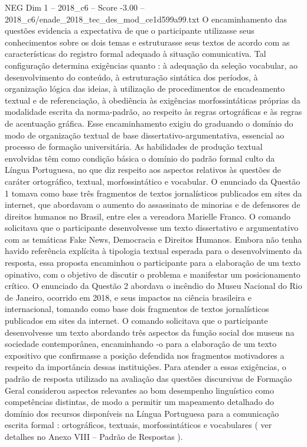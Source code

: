 \begin{textsample}{NEG Dim 1 – 2018\_c6 – Score -3.00 – 2018\_c6/enade\_2018\_tec\_des\_mod\_ce1d599a99.txt}
O encaminhamento das questões evidencia a expectativa de que o participante utilizasse seus conhecimentos sobre os dois temas e estruturasse seus textos de acordo com as características do registro formal adequado à situação comunicativa.
Tal configuração determina exigências quanto : à adequação da seleção vocabular, ao desenvolvimento do conteúdo, à estruturação sintática dos períodos, à organização lógica das ideias, à utilização de procedimentos de encadeamento textual e de referenciação, à obediência às exigências morfossintáticas próprias da modalidade escrita da norma-padrão, ao respeito às regras ortográficas e às regras de acentuação gráfica.
Esse encaminhamento exigiu do graduando o domínio do modo de organização textual de base dissertativo-argumentativa, essencial ao processo de formação universitária.
As habilidades de produção textual envolvidas têm como condição básica o domínio do padrão formal culto da Língua Portuguesa, no que diz respeito aos aspectos relativos às questões de caráter ortográfico, textual, morfossintático e vocabular.
O enunciado da Questão 1 tomava como base três fragmentos de textos jornalísticos publicados em sites da internet, que abordavam o aumento do assassinato de minorias e de defensores de direitos humanos no Brasil, entre eles a vereadora Marielle Franco.
O comando solicitava que o participante desenvolvesse um texto dissertativo e argumentativo com as temáticas Fake News, Democracia e Direitos Humanos.
Embora não tenha havido referência explícita à tipologia textual esperada para o desenvolvimento da resposta, essa proposta encaminhou o participante para a elaboração de um texto opinativo, com o objetivo de discutir o problema e manifestar um posicionamento crítico.
O enunciado da Questão 2 abordava o incêndio do Museu Nacional do Rio de Janeiro, ocorrido em 2018, e seus impactos na ciência brasileira e internacional, tomando como base dois fragmentos de textos jornalísticos publicados em sites da internet.
O comando solicitava que o participante desenvolvesse um texto abordando três aspectos da função social dos museus na sociedade contemporânea, encaminhando -o para a elaboração de um texto expositivo que confirmasse a posição defendida nos fragmentos motivadores a respeito da importância dessas instituições.
Para atender a essas exigências, o padrão de resposta utilizado na avaliação das questões discursivas de Formação Geral considerou aspectos relevantes ao bom desempenho linguístico como competências distintas, de modo a permitir um mapeamento detalhado do domínio dos recursos disponíveis na Língua Portuguesa para a comunicação escrita formal : ortográficos, textuais, morfossintáticos e vocabulares ( ver detalhes no Anexo VIII – Padrão de Respostas ).

\end{textsample}
